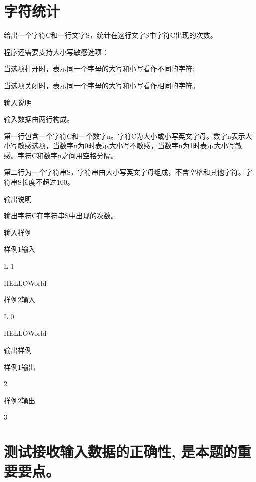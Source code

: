 \section{字符统计}
给出一个字符C和一行文字S，统计在这行文字S中字符C出现的次数。

程序还需要支持大小写敏感选项：

当选项打开时，表示同一个字母的大写和小写看作不同的字符;

当选项关闭时，表示同一个字母的大写和小写看作相同的字符。

输入说明	

输入数据由两行构成。

第一行包含一个字符C和一个数字n。字符C为大小或小写英文字母。数字n表示大小写敏感选项，当数字n为0时表示大小写不敏感，当数字n为1时表示大小写敏感。字符C和数字n之间用空格分隔。

第二行为一个字符串S，字符串由大小写英文字母组成，不含空格和其他字符。字符串S长度不超过100。

输出说明
	
输出字符C在字符串S中出现的次数。

输入样例

样例1输入

L 1

HELLOWorld

样例2输入

L 0

HELLOWorld

输出样例

样例1输出	

2

样例2输出

3

\section*{测试接收输入数据的正确性, 是本题的重要要点。}

